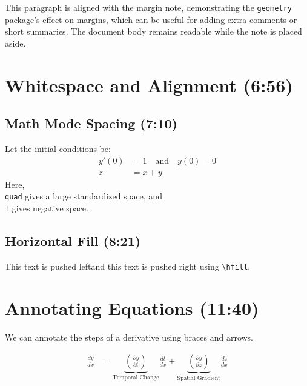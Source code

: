 \documentclass[11pt]{article}
\begin{document}
\lipsum[6] %

This paragraph is aligned with the margin note, demonstrating the \texttt{geometry} package's effect on margins, which can be useful for adding extra comments or short summaries. 
The document body remains readable while the note is placed aside.

\section{Whitespace and Alignment (6:56)}

\subsection{Math Mode Spacing (7:10)}
Let the initial conditions be:
\begin{align*}
    y'(0) &= 1 \quad \text{and} \quad y(0) = 0 \\
    z &= x \! + \! y %
\end{align*}
Here, \texttt{\\quad} gives a large standardized space, and \texttt{\\!} gives negative space.

\subsection{Horizontal Fill (8:21)}
\noindent This text is pushed left\hfill and this text is pushed right using \texttt{\textbackslash hfill}.

\section{Annotating Equations (11:40)}

We can annotate the steps of a derivative using braces and arrows.

\begin{align}
    \label{eq:derivative}
    \frac{dy}{dx} &= \underbrace{\left(\frac{\partial y}{\partial t}\right)}_{\text{Temporal Change}} \frac{dt}{dx} \! + \! \underbrace{\left(\frac{\partial y}{\partial z}\right)}_{\text{Spatial Gradient}} \frac{dz}{dx}
\end{align}
\end{document}
